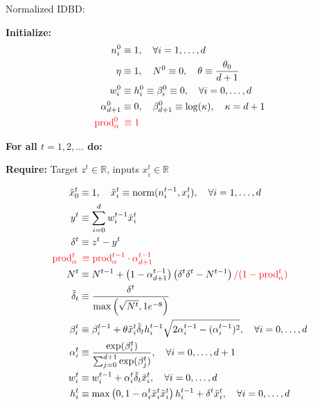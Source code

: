 \documentclass{article}
\newcommand{\red}[1]{\textcolor{red}{#1}}
\begin{document}
	{\large Normalized IDBD:}
	
	\medskip
	
	\textbf{Initialize:}
	\begin{align*}
		n_i^0 & \equiv 1, \quad \forall i = 1, \dots, d \\
		\eta & \equiv 1, \quad N^0 \equiv 0, \quad \theta \equiv \frac{\theta_0}{d+1} \\
		w_i^0 & \equiv h_i^0 \equiv \beta_i^0 \equiv 0, \quad \forall i = 0, \dots, d \\
		\alpha_{d+1}^0 & \equiv 0, \quad \beta_{d+1}^0 \equiv \log(\kappa), \quad \kappa = d + 1 \\
		\red{\mathrm{prod}_\alpha^0} \,&\,\, \red{\equiv 1}
	\end{align*}
	
	\textbf{For all $t = 1, 2, \dots$ do:}
	
	\textbf{Require:} Target $z^t \in \mathbb{R}$, inputs $x_i^t \in \mathbb{R}$
	
	\begin{align}
		\tilde{x}_0^t & \equiv 1, \quad \tilde{x}_i^t \equiv \text{norm}(n_i^{t-1}, x_i^t), \quad \forall i = 1, \dots, d \\
		y^t & \equiv \sum_{i=0}^d w_i^{t-1} \tilde{x}_i^t \\
		\delta^t & \equiv z^t - y^t \\
		\red{\mathrm{prod}_\alpha^t} \,&\,\, \red{\equiv \mathrm{prod}_\alpha^{t-1} \cdot \alpha_{d+1}^{t-1}} \\
		N^t & \equiv N^{t-1} + \left(1 - \alpha_{d+1}^{t-1}\right)\left( \delta^t\delta^t - N^{t-1} \right) \red{/(1 - \mathrm{prod}_\alpha^t)} \\
		\tilde{\delta}_t & \equiv \frac{\delta^t}{\max\left( \sqrt{N^t}, 1e^{-8} \right)} \\
		\beta_i^t & \equiv \beta_i^{t-1} + \theta \tilde{x}_i^t \tilde{\delta}_t h_i^{t-1} \sqrt{2 \alpha_i^{t-1} - (\alpha_i^{t-1})^2}, \quad \forall i = 0, \dots, d \\
		\alpha_i^t & \equiv \frac{\exp(\beta_i^t)}{\sum_{j=0}^{d+1} \exp(\beta_j^t)}, \quad \forall i = 0, \dots, d+1 \\
			w_i^t & \equiv w_i^{t-1} + \alpha_i^t \tilde{\delta}_t \tilde{x}_i^t, \quad \forall i = 0, \dots, d\\
		h_i^t & \equiv \max\left( 0,1 - \alpha_i^t \tilde{x}_i^t \tilde{x}_i^t\right) h_i^{t-1} + \delta^t \tilde{x}_i^t, \quad \forall i = 0, \dots, d
	\end{align}
	
\end{document}

